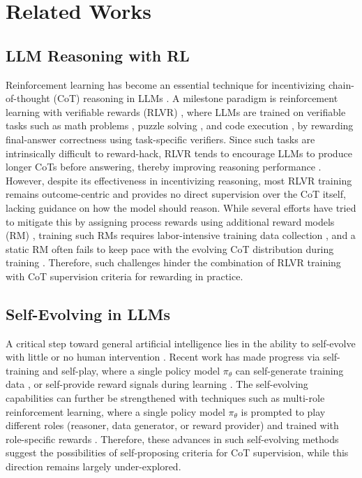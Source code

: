 \section{Related Works}
\subsection{LLM Reasoning with RL}
Reinforcement learning has become an essential technique for incentivizing chain-of-thought (CoT) reasoning in LLMs \cite{RL4LRM, Survey-LLMs}.
A milestone paradigm is reinforcement learning with verifiable rewards (RLVR) \cite{DeepSeekMath, O1, Deepseek-R1}, where LLMs are trained on verifiable tasks such as math problems \cite{AIME}, puzzle solving \cite{ARC-AGI-2}, and code execution \cite{LiveCodeBench}, by rewarding final-answer correctness using task-specific verifiers.
Since such tasks are intrinsically difficult to reward-hack, RLVR tends to encourage LLMs to produce longer CoTs before answering, thereby improving reasoning performance \cite{Deepseek-R1, O1}.
However, despite its effectiveness in incentivizing reasoning, most RLVR training remains outcome-centric and provides no direct supervision over the CoT itself, lacking guidance on how the model should reason.
While several efforts have tried to mitigate this by assigning process rewards using additional reward models (RM) \cite{PRM8K}, training such RMs requires labor-intensive training data collection \cite{PRM8K, PRIME, ProcessBench}, and a static RM often fails to keep pace with the evolving CoT distribution during training \cite{Deepseek-R1}.
Therefore, such challenges hinder the combination of RLVR training with CoT supervision criteria for rewarding in practice.

\subsection{Self-Evolving in LLMs}
A critical step toward general artificial intelligence lies in the ability to self-evolve with little or no human intervention \cite{self-evolving-survey}. 
Recent work has made progress via self-training and self-play, where a single policy model $\pi_\theta$ can self-generate training data \cite{AbsoluteZero, SSP, SPICE}, or self-provide reward signals during learning \cite{SPIN, SeRL, SRLM}. 
The self-evolving capabilities can further be strengthened with techniques such as multi-role reinforcement learning, where a single policy model $\pi_\theta$ is prompted to play different roles (\eg reasoner, data generator, or reward provider) and trained with role-specific rewards \cite{AbsoluteZero, SPICE, Alignmen-Waltz}.
Therefore, these advances in such self-evolving methods suggest the possibilities of self-proposing criteria for CoT supervision, while this direction remains largely under-explored.

